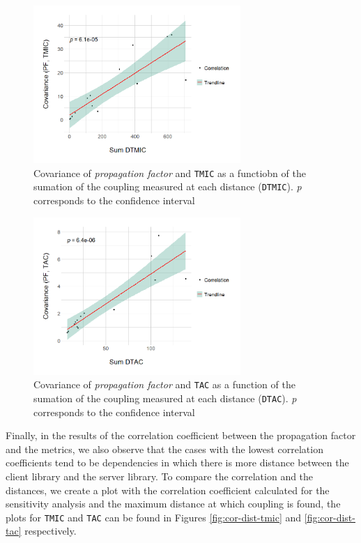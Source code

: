 \begin{figure}[ht!]
\begin{center}
\includegraphics[width=0.7\textwidth]{figures/results/covariance-values-tmic.png}
\caption{Covariance of \textit{propagation factor} and \texttt{TMIC} as a functiobn of the sumation of the coupling measured at each distance (\texttt{DTMIC}). \textit{p} corresponds to the confidence interval}
\label{fig:cov-value-tmic}
\end{center}
\end{figure}

\begin{figure}[ht!]
\begin{center}
\includegraphics[width=0.7\textwidth]{figures/results/covariance-values-tac.png}
\caption{Covariance of \textit{propagation factor} and \texttt{TAC} as a function of the sumation of the coupling measured at each distance (\texttt{DTAC}). \textit{p} corresponds to the confidence interval}
\label{fig:cov-value-tac}
\end{center}
\end{figure}

Finally, in the results of the correlation coefficient between the propagation factor and the metrics, we also observe that the cases with the lowest correlation coefficients tend to be dependencies in which there is more distance between the client library and the server library. To compare the correlation and the distances, we create a plot with the correlation coefficient calculated for the sensitivity analysis and the maximum distance at which coupling is found, the plots for \texttt{TMIC} and \texttt{TAC} can be found in Figures \ref{fig:cor-dist-tmic} and \ref{fig:cor-dist-tac} respectively.

